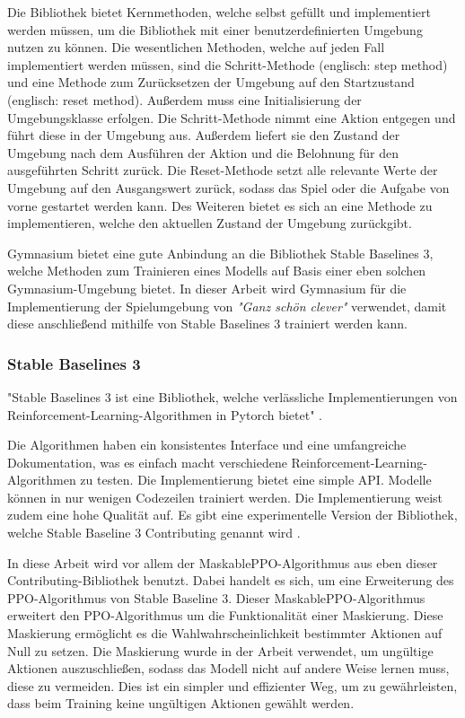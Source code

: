 Die Bibliothek bietet Kernmethoden, welche selbst gefüllt und implementiert werden müssen, um die Bibliothek mit einer benutzerdefinierten Umgebung nutzen zu können. Die wesentlichen Methoden, welche auf jeden Fall implementiert werden müssen, sind die Schritt-Methode (englisch: step method) und eine Methode zum Zurücksetzen der Umgebung auf den Startzustand (englisch: reset method). Außerdem muss eine Initialisierung der Umgebungsklasse erfolgen. Die Schritt-Methode nimmt eine Aktion entgegen und führt diese in der Umgebung aus. Außerdem liefert sie den Zustand der Umgebung nach dem Ausführen der Aktion und die Belohnung für den ausgeführten Schritt zurück. Die Reset-Methode setzt alle relevante Werte der Umgebung auf den Ausgangswert zurück, sodass das Spiel oder die Aufgabe von vorne gestartet werden kann. Des Weiteren bietet es sich an eine Methode zu implementieren, welche den aktuellen Zustand der Umgebung zurückgibt.

Gymnasium bietet eine gute Anbindung an die Bibliothek Stable Baselines 3, welche Methoden zum Trainieren eines Modells auf Basis einer eben solchen Gymnasium-Umgebung bietet. In dieser Arbeit wird Gymnasium für die Implementierung der Spielumgebung von \textit{"Ganz schön clever"} verwendet, damit diese anschließend mithilfe von Stable Baselines 3 trainiert werden kann.
\subsubsection{Stable Baselines 3}
"Stable Baselines 3 ist eine Bibliothek, welche verlässliche Implementierungen von Reinforcement-Learning-Algorithmen in Pytorch bietet" \cite[Seite 1]{noauthor_stable-baselines3_nodate}. 

Die Algorithmen haben ein konsistentes Interface und eine umfangreiche Dokumentation, was es einfach macht verschiedene Reinforcement-Learning-Algorithmen zu testen. Die Implementierung bietet eine simple API. Modelle können in nur wenigen Codezeilen trainiert werden. Die Implementierung weist zudem eine hohe Qualität auf. Es gibt eine experimentelle Version der Bibliothek, welche Stable Baseline 3 Contributing genannt wird \cite[Seite 1-3]{noauthor_stable-baselines3_nodate}.

In diese Arbeit wird vor allem der MaskablePPO-Algorithmus aus eben dieser Contributing-Bibliothek benutzt. Dabei handelt es sich, um eine Erweiterung des PPO-Algorithmus von Stable Baseline 3. Dieser MaskablePPO-Algorithmus erweitert den PPO-Algorithmus um die Funktionalität einer Maskierung. Diese Maskierung ermöglicht es die Wahlwahrscheinlichkeit bestimmter Aktionen auf Null zu setzen. Die Maskierung wurde in der Arbeit verwendet, um ungültige Aktionen auszuschließen, sodass das Modell nicht auf andere Weise lernen muss, diese zu vermeiden. Dies ist ein simpler und effizienter Weg, um zu gewährleisten, dass beim Training keine ungültigen Aktionen gewählt werden.
